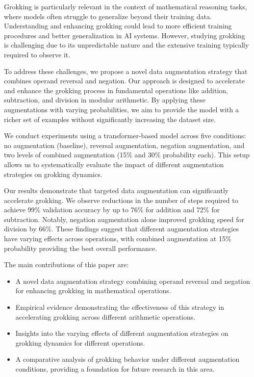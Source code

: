 \documentclass{article} %
\begin{document}
Grokking is particularly relevant in the context of mathematical reasoning tasks, where models often struggle to generalize beyond their training data. Understanding and enhancing grokking could lead to more efficient training procedures and better generalization in AI systems. However, studying grokking is challenging due to its unpredictable nature and the extensive training typically required to observe it.

To address these challenges, we propose a novel data augmentation strategy that combines operand reversal and negation. Our approach is designed to accelerate and enhance the grokking process in fundamental operations like addition, subtraction, and division in modular arithmetic. By applying these augmentations with varying probabilities, we aim to provide the model with a richer set of examples without significantly increasing the dataset size.

We conduct experiments using a transformer-based model \cite{vaswani2017attention} across five conditions: no augmentation (baseline), reversal augmentation, negation augmentation, and two levels of combined augmentation (15\% and 30\% probability each). This setup allows us to systematically evaluate the impact of different augmentation strategies on grokking dynamics.

Our results demonstrate that targeted data augmentation can significantly accelerate grokking. We observe reductions in the number of steps required to achieve 99\% validation accuracy by up to 76\% for addition and 72\% for subtraction. Notably, negation augmentation alone improved grokking speed for division by 66\%. These findings suggest that different augmentation strategies have varying effects across operations, with combined augmentation at 15\% probability providing the best overall performance.

The main contributions of this paper are:
\begin{itemize}
    \item A novel data augmentation strategy combining operand reversal and negation for enhancing grokking in mathematical operations.
    \item Empirical evidence demonstrating the effectiveness of this strategy in accelerating grokking across different arithmetic operations.
    \item Insights into the varying effects of different augmentation strategies on grokking dynamics for different operations.
    \item A comparative analysis of grokking behavior under different augmentation conditions, providing a foundation for future research in this area.
\end{itemize}
\end{document}
